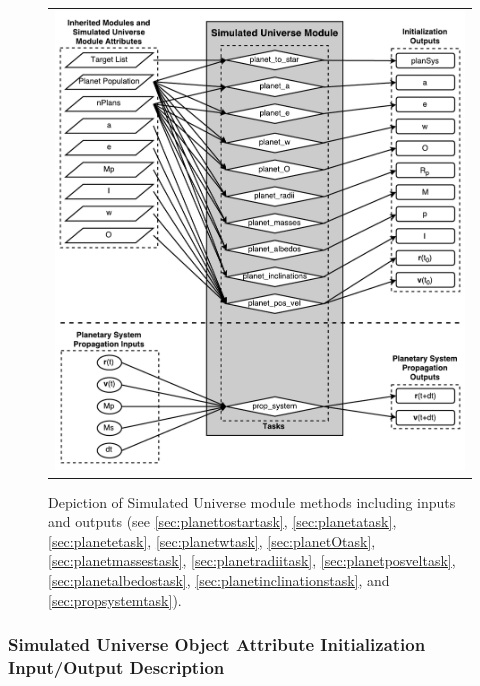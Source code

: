 \documentclass[cleanfoot]{asme2ej}
\begin{document}
\begin{figure}[ht]
    \begin{center}
        \begin{tabular}{c}
             \includegraphics[width=\textwidth]{SimulatedUniverseTasks}
        \end{tabular}
    \end{center}
    \caption{\label{fig:simulateduniversemodule} Depiction of Simulated Universe module methods including inputs and outputs (see \ref{sec:planettostartask}, \ref{sec:planetatask}, \ref{sec:planetetask}, \ref{sec:planetwtask}, \ref{sec:planetOtask}, \ref{sec:planetmassestask}, \ref{sec:planetradiitask}, \ref{sec:planetposveltask}, \ref{sec:planetalbedostask}, \ref{sec:planetinclinationstask}, and \ref{sec:propsystemtask}).}
\end{figure}

\subsubsection{Simulated Universe Object Attribute Initialization Input/Output Description}
\end{document}
